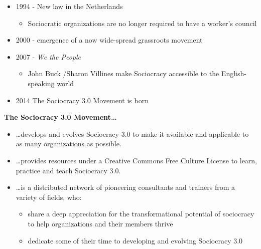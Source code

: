 \begin{itemize}
\begin{itemize}
\end{itemize}

\item 1994 - New law in the Netherlands

\begin{itemize}
\item Sociocratic organizations are no longer required to have a worker’s council

\end{itemize}

\item 2000 - emergence of a now wide-spread grassroots movement

\item 2007 - \emph{We the People}

\begin{itemize}
\item John Buck \slash  Sharon Villines make Sociocracy accessible to the English-speaking world

\end{itemize}

\item 2014 The Sociocracy 3.0 Movement is born

\end{itemize}

\textbf{The Sociocracy 3.0 Movement{\ldots}}

\begin{itemize}
\item {\ldots}develops and evolves Sociocracy 3.0 to make it available and applicable to as many organizations as possible.

\item {\ldots}provides resources under a Creative Commons Free Culture License to learn, practice and teach Sociocracy 3.0.

\item {\ldots}is a distributed network of pioneering consultants and trainers from a variety of fields, who:

\begin{itemize}
\item share a deep appreciation for the transformational potential of sociocracy to help organizations and their members thrive

\item dedicate some of their time to developing and evolving Sociocracy 3.0

\end{itemize}

\end{itemize}

